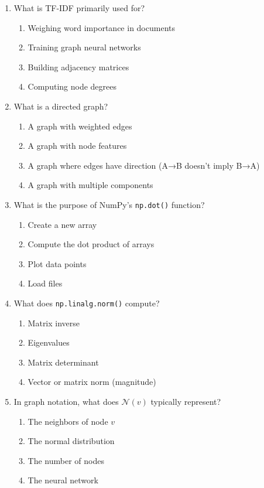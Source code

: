 \documentclass[12pt,a4paper]{article}
\begin{document}
\begin{enumerate}
\item What is TF-IDF primarily used for?
\begin{enumerate}[label=\Alph*)]
    \item Weighing word importance in documents
    \item Training graph neural networks
    \item Building adjacency matrices
    \item Computing node degrees
\end{enumerate}

\item What is a directed graph?
\begin{enumerate}[label=\Alph*)]
    \item A graph with weighted edges
    \item A graph with node features
    \item A graph where edges have direction (A→B doesn't imply B→A)
    \item A graph with multiple components
\end{enumerate}

\item What is the purpose of NumPy's \texttt{np.dot()} function?
\begin{enumerate}[label=\Alph*)]
    \item Create a new array
    \item Compute the dot product of arrays
    \item Plot data points
    \item Load files
\end{enumerate}

\item What does \texttt{np.linalg.norm()} compute?
\begin{enumerate}[label=\Alph*)]
    \item Matrix inverse
    \item Eigenvalues
    \item Matrix determinant
    \item Vector or matrix norm (magnitude)
\end{enumerate}

\item In graph notation, what does $\mathcal{N}(v)$ typically represent?
\begin{enumerate}[label=\Alph*)]
    \item The neighbors of node $v$
    \item The normal distribution
    \item The number of nodes
    \item The neural network
\end{enumerate}


\end{enumerate}
\end{document}
